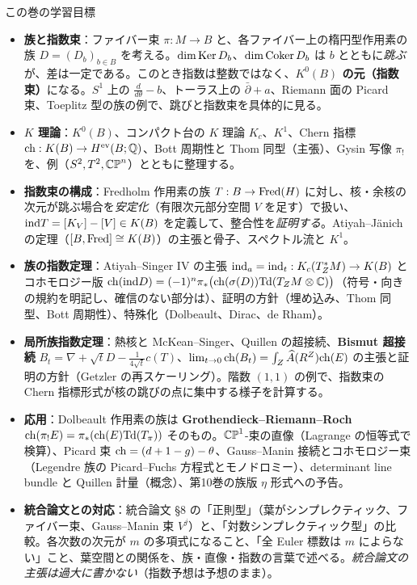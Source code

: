 \begin{goalbox}{この巻の学習目標}
\begin{itemize}
\item \textbf{族と指数束}：ファイバー束 $\pi:M\to B$ と、各ファイバー上の楕円型作用素の族 $D=(D_b)_{b\in B}$ を考える。$\dim\operatorname{Ker} D_b$、$\dim\operatorname{Coker} D_b$ は $b$ とともに\emph{跳ぶ}が、差は一定である。このとき指数は整数ではなく、\textbf{$K^0(B)$ の元（指数束）}になる。$S^1$ 上の $\frac d{d\theta}-b$、トーラス上の $\bar\partial+a$、Riemann 面の Picard 束、Toeplitz 型の族の例で、跳びと指数束を具体的に見る。
\item \textbf{$K$ 理論}：$K^0(B)$、コンパクト台の $K$ 理論 $K_c$、$K^1$、Chern 指標 $\mathrm{ch}:K(B)\to H^{\mathrm{ev}}(B;\mathbb Q)$、Bott 周期性と Thom 同型（主張）、Gysin 写像 $\pi_!$ を、例（$S^2,T^2,\mathbb{CP}^n$）とともに整理する。
\item \textbf{指数束の構成}：Fredholm 作用素の族 $T:B\to\mathrm{Fred}(H)$ に対し、核・余核の次元が跳ぶ場合を\emph{安定化}（有限次元部分空間 $V$ を足す）で扱い、$\mathrm{ind} T=[K_V]-[V]\in K(B)$ を定義して、整合性を\emph{証明する}。Atiyah--J\"anich の定理（$[B,\mathrm{Fred}]\cong K(B)$）の主張と骨子、スペクトル流と $K^1$。
\item \textbf{族の指数定理}：Atiyah--Singer IV の主張 $\mathrm{ind}_a=\mathrm{ind}_t:K_c(T^*_ZM)\to K(B)$ とコホモロジー版 $\mathrm{ch}(\mathrm{ind} D)=(-1)^n\pi_*\bigl(\mathrm{ch}(\sigma(D))\mathrm{Td}(T_ZM\otimes\mathbb C)\bigr)$（符号・向きの規約を明記し、確信のない部分は\tQ）、証明の方針（埋め込み、Thom 同型、Bott 周期性）、特殊化（Dolbeault、Dirac、de Rham）。
\item \textbf{局所族指数定理}：熱核と McKean--Singer、Quillen の超接続、\textbf{Bismut 超接続} $B_t=\nabla+\sqrt tD-\frac1{4\sqrt t}c(T)$、$\lim_{t\to0}\mathrm{ch}(B_t)=\int_Z\widehat{A}(R^Z)\mathrm{ch}(E)$ の主張と証明の方針（Getzler の再スケーリング）。階数 $(1,1)$ の例で、指数束の Chern 指標形式が核の跳びの点に集中する様子を計算する。
\item \textbf{応用}：Dolbeault 作用素の族は \textbf{Grothendieck--Riemann--Roch} $\mathrm{ch}(\pi_!E)=\pi_*(\mathrm{ch}(E)\mathrm{Td}(T_\pi))$ そのもの。$\mathbb{CP}^1$-束の直像（Lagrange の恒等式で検算）、Picard 束 $\mathrm{ch}=(d+1-g)-\theta$、Gauss--Manin 接続とコホモロジー束（Legendre 族の Picard--Fuchs 方程式とモノドロミー）、determinant line bundle と Quillen 計量（概念）、第10巻の族版 $\eta$ 形式への予告。
\item \textbf{統合論文との対応}：統合論文 \S8 の「正則型」（葉がシンプレクティック、ファイバー束、Gauss--Manin 束 $V^j$）と、「対数シンプレクティック型」の比較。各次数の次元が $m$ の多項式になること、「全 Euler 標数は $m$ によらない」こと、葉空間との関係を、族・直像・指数の言葉で述べる。\emph{統合論文の主張は過大に書かない}（指数予想は予想のまま）。
\end{itemize}
\end{goalbox}
